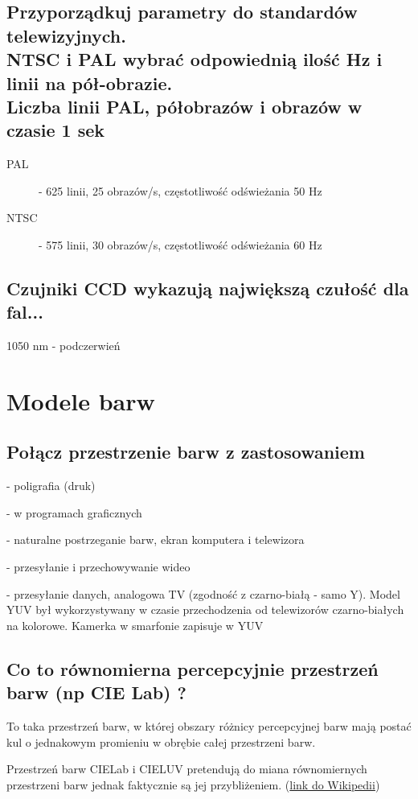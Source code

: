 \documentclass[a4paper, 12pt, titlepage]{article}
\begin{document}
\subsection{Przyporządkuj parametry do standardów telewizyjnych. \\ NTSC i PAL wybrać odpowiednią ilość Hz i linii na pół-obrazie. \\ Liczba linii PAL, półobrazów i obrazów w czasie 1 sek}
\begin{description}
	\item[PAL] - 625 linii, 25 obrazów/s, częstotliwość odświeżania 50 Hz
	\item[NTSC] - 575 linii, 30 obrazów/s, częstotliwość odświeżania 60 Hz
\end{description}
	
\subsection{Czujniki CCD wykazują największą czułość dla fal...}
1050 nm - podczerwień
\pagebreak\section{Modele barw}

\subsection{Połącz przestrzenie barw z zastosowaniem}
\begin{description}[noitemsep, labelwidth=1.7cm]
	\item[CMY(K)] -	poligrafia (druk)
	\item[HSV] - w programach graficznych
	\item[RGB] - naturalne postrzeganie barw, ekran komputera i telewizora
	\item[YCrCb] - przesyłanie i przechowywanie wideo
	\item[YUV] - przesyłanie danych, analogowa TV (zgodność z czarno-białą - samo Y). Model YUV był wykorzystywany w czasie przechodzenia od telewizorów czarno-białych na kolorowe. Kamerka w smarfonie zapisuje w YUV
\end{description}

\subsection{Co to równomierna percepcyjnie przestrzeń barw (np CIE Lab) ?}
To taka przestrzeń barw, w której obszary różnicy percepcyjnej barw mają postać kul o jednakowym promieniu w obrębie całej przestrzeni barw. \par
Przestrzeń barw CIELab i CIELUV pretendują do miana równomiernych przestrzeni barw jednak faktycznie są jej przybliżeniem. (\href{https://pl.wikipedia.org/wiki/R%C3%B3wnomierna_przestrze%C5%84_barw}{link do Wikipedii})
	
\end{document}
